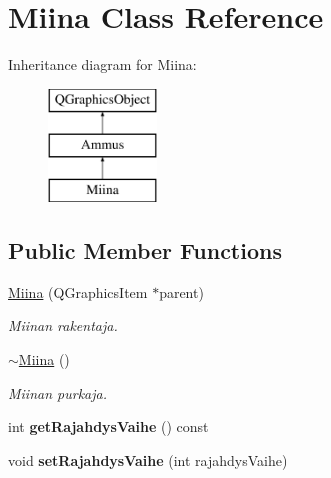 \hypertarget{class_miina}{\section{Miina Class Reference}
\label{class_miina}
}
Inheritance diagram for Miina\-:\begin{figure}[H]
\begin{center}
\leavevmode
\includegraphics[height=3.000000cm]{class_miina}
\end{center}
\end{figure}
\subsection*{Public Member Functions}
\begin{DoxyCompactItemize}
\item 
\hyperlink{class_miina_aa6504bc6417688ddd65e3240118b69c9}{Miina} (Q\-Graphics\-Item $\ast$parent)
\begin{DoxyCompactList}\small\item\em Miinan rakentaja. \end{DoxyCompactList}\item 
\hyperlink{class_miina_adb79c83dd78271191b40bf7700d663db}{$\sim$\-Miina} ()
\begin{DoxyCompactList}\small\item\em Miinan purkaja. \end{DoxyCompactList}\item 
\hypertarget{class_miina_ad05abb5a4a0da5b960bc418158fc7c75}{int {\bfseries get\-Rajahdys\-Vaihe} () const }\label{class_miina_ad05abb5a4a0da5b960bc418158fc7c75}

\item 
\hypertarget{class_miina_aae598593480355a3ad261423564f035e}{void {\bfseries set\-Rajahdys\-Vaihe} (int rajahdys\-Vaihe)}\label{class_miina_aae598593480355a3ad261423564f035e}

\end{DoxyCompactItemize}
